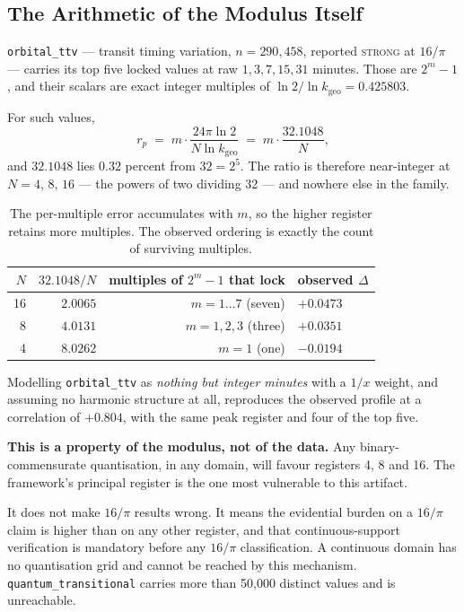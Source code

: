 \documentclass[11pt, letterpaper, openany]{book}
\newcommand{\kgeo}{k_{\mathrm{geo}}}
\begin{document}
\subsection{The Arithmetic of the Modulus Itself}

\texttt{orbital\_ttv} --- transit timing variation, $n = 290{,}458$, reported \textsc{strong} at
$16/\pi$ --- carries its top five locked values at raw $1, 3, 7, 15, 31$ minutes. Those are
$2^m - 1$, and their scalars are exact integer multiples of $\ln 2 / \ln \kgeo = 0.425803$.

For such values,
\begin{equation}
r_p \;=\; m \cdot \frac{24\pi \ln 2}{N \ln \kgeo} \;=\; m \cdot \frac{32.1048}{N},
\end{equation}
\noindent and $32.1048$ lies $0.32$ percent from $32 = 2^5$. The ratio is therefore near-integer
at $N = 4$, $8$, $16$ --- the powers of two dividing 32 --- and nowhere else in the family.

\begin{table}[H]
\centering
\small
\begin{tabular}{@{}rrrl@{}}
\toprule
$N$ & $32.1048/N$ & \textbf{multiples of $2^m-1$ that lock} & \textbf{observed $\Delta$} \\
\midrule
16 & $2.0065$ & $m = 1\ldots7$ (seven) & $+0.0473$ \\
8 & $4.0131$ & $m = 1,2,3$ (three) & $+0.0351$ \\
4 & $8.0262$ & $m = 1$ (one) & $-0.0194$ \\
\bottomrule
\end{tabular}
\caption{The per-multiple error accumulates with $m$, so the higher register retains more
multiples. The observed ordering is exactly the count of surviving multiples.}
\end{table}

Modelling \texttt{orbital\_ttv} as \emph{nothing but integer minutes} with a $1/x$ weight, and
assuming no harmonic structure at all, reproduces the observed profile at a correlation of
$+0.804$, with the same peak register and four of the top five.

\begin{warningbox}
\textbf{This is a property of the modulus, not of the data.} Any binary-commensurate
quantisation, in any domain, will favour registers 4, 8 and 16. The framework's principal
register is the one most vulnerable to this artifact.

\medskip
\noindent It does not make $16/\pi$ results wrong. It means the evidential burden on a $16/\pi$
claim is higher than on any other register, and that continuous-support verification is
mandatory before any $16/\pi$ classification. A continuous domain has no quantisation grid and
cannot be reached by this mechanism. \texttt{quantum\_transitional} carries more than 50{,}000
distinct values and is unreachable.
\end{warningbox}
\end{document}
